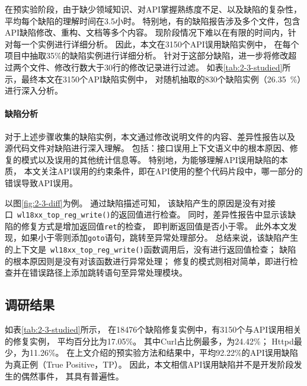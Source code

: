 在预实验阶段，由于缺少领域知识、对API掌握熟练度不足、以及缺陷的复杂性，
平均每个缺陷的理解时间在3.5小时。
特别地，有的缺陷报告涉及多个文件，包含API缺陷修改、重构、文档等多个内容。
现阶段情况下难以在有限的时间内，针对每一个实例进行详细分析。
因此，本文在3150个API误用缺陷实例中，
在每个项目中抽取35\%的缺陷实例进行详细分析。
针对于这部分缺陷，进一步将修改超过两个文件、修改行数大于30行的修改记录进行过滤。
如表\ref{tab:2-3-studied}所示，最终本文在3150个API缺陷实例中，
对随机抽取的830个缺陷实例（26.35~\%）进行深入分析。


\paragraph{缺陷分析}
对于上述步骤收集的缺陷实例，本文通过修改说明文件的内容、差异性报告以及
源代码文件对缺陷进行深入理解。
包括：接口误用上下文语义中的根本原因、修复的模式以及误用的其他统计信息等。
特别地，为能够理解API误用缺陷的本质，
本文关注API误用的约束条件，即在API使用的整个代码片段中，哪一部分的错误导致API误用。

以图\ref{fig:2-3-diff}为例。
通过缺陷描述可知，
该缺陷产生的原因是没有对接口~\texttt{wl18xx\_top\_reg\_write()}的返回值进行检查。
同时，差异性报告中显示该缺陷的修复方式是增加返回值\texttt{ret}的检查，
即判断返回值是否小于零。
此外本文发现，如果小于零则添加\texttt{goto}语句，跳转至异常处理部分。
总结来说，该缺陷产生的上下文是~\texttt{wl18xx\_top\_reg\_write()}函数调用后，没有进行返回值检查；
缺陷的根本原因则是没有对该函数进行异常处理；
修复的模式则相对简单，即进行检查并在错误路径上添加跳转语句至异常处理模块。


\subsection{调研结果}
如表\ref{tab:2-3-studied}所示，
在18476个缺陷修复实例中，有3150个与API误用相关的修复实例，
平均百分比为17.05\%。
其中Curl占比例最多，为24.42\%；
Httpd最少，为11.26\%。
在上文介绍的预实验方法和结果中，平均92.22\%的API误用缺陷为真正例（True Positive，TP）。
因此，本文相信API误用缺陷并不是开发阶段发生的偶然事件，
其具有普遍性。

\vspace*{10pt}
\begin{center}
\noindent{}
\end{center}

